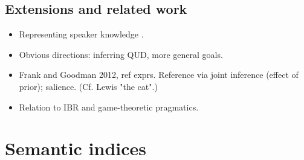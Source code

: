 \documentclass[pdfextras]{handbook}
\begin{document}


\subsection{Extensions and related work}


\begin{itemize}
\item Representing speaker knowledge \cite{Goodman2013}.
\item Obvious directions: inferring QUD, more general goals.
\item Frank and Goodman 2012, ref exprs. Reference via joint inference (effect of prior); salience. (Cf. Lewis "the cat".)
\item Relation to IBR and game-theoretic pragmatics.
\end{itemize}





\section{Semantic indices}
\label{indices}
\end{document}
